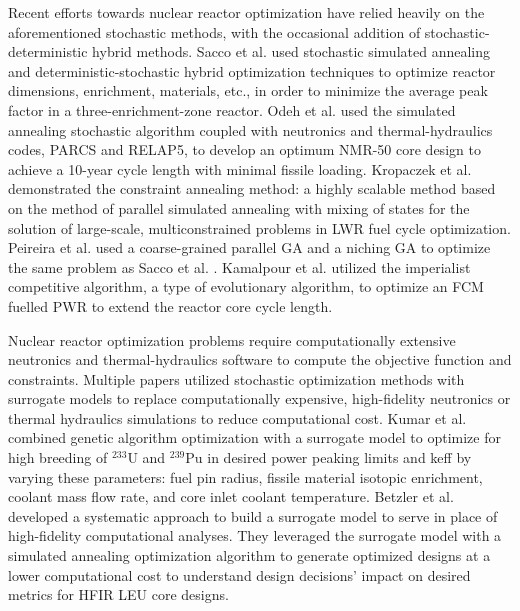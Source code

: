 Recent efforts towards nuclear reactor optimization have relied heavily on 
the aforementioned stochastic methods, with the occasional addition of 
stochastic-deterministic hybrid methods. 
Sacco et al. \cite{sacco_two_2006,sacco_metropolis_2008} used stochastic 
simulated annealing and deterministic-stochastic hybrid optimization techniques 
to optimize reactor dimensions, enrichment, materials, etc., in order to 
minimize the average peak factor in a three-enrichment-zone reactor. 
Odeh et al. \cite{odeh_core_2016} used the simulated annealing stochastic algorithm 
coupled with neutronics and thermal-hydraulics codes, \gls{PARCS} and RELAP5, 
to develop an optimum \gls{NMR-50} core design to achieve a 10-year cycle length 
with minimal fissile loading. 
Kropaczek et al. \cite{kropaczek_large-scale_2019} demonstrated the constraint 
annealing method: a highly scalable method based on the method of parallel 
simulated annealing with mixing of states \cite{kropaczek_constraint_2019} for 
the solution of large-scale, multiconstrained problems in \gls{LWR} fuel cycle 
optimization. 
Peireira et al. \cite{pereira_coarse-grained_2003,pereira_parallel_2008} 
used a coarse-grained parallel \gls{GA} and a niching \gls{GA}
to optimize the same problem as Sacco et al. \cite{sacco_two_2006}. 
Kamalpour et al. \cite{kamalpour_smart_2020} utilized the imperialist competitive 
algorithm, a type of evolutionary algorithm, to optimize an \gls{FCM} fuelled 
\gls{PWR} to extend the reactor core cycle length. 

Nuclear reactor optimization problems require computationally 
extensive neutronics and thermal-hydraulics software to compute the objective 
function and constraints. 
Multiple papers utilized stochastic optimization methods with surrogate models 
to replace computationally expensive, high-fidelity neutronics or thermal hydraulics 
simulations to reduce computational cost.
Kumar et al. \cite{kumar_new_2015} combined genetic algorithm optimization 
with a surrogate model to optimize for high breeding of $^{233}$U and $^{239}$Pu 
in desired power peaking limits and keff by varying these parameters: fuel pin 
radius,  fissile material isotopic enrichment, coolant mass flow rate, and 
core inlet coolant temperature.
Betzler et al. \cite{betzler_design_2019} developed a systematic approach to 
build a surrogate model to serve in place of high-fidelity computational 
analyses. 
They leveraged the surrogate model with a simulated annealing optimization 
algorithm to generate optimized designs at a lower computational cost to 
understand design decisions' impact on desired metrics for \gls{HFIR} \gls{LEU} 
core designs.

